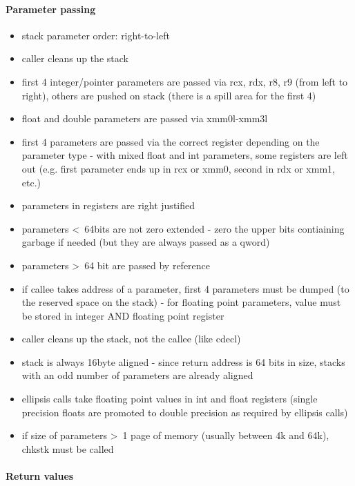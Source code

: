 \paragraph{Parameter passing}

\begin{itemize}
\item stack parameter order: right-to-left
\item caller cleans up the stack
\item first 4 integer/pointer parameters are passed via rcx, rdx, r8, r9 (from left to right), others are pushed on stack (there is a
spill area for the first 4)
\item float and double parameters are passed via xmm0l-xmm3l
\item first 4 parameters are passed via the correct register depending on the parameter type - with mixed float and int parameters,
some registers are left out (e.g. first parameter ends up in rcx or xmm0, second in rdx or xmm1, etc.)
\item parameters in registers are right justified
\item parameters \textless\ 64bits are not zero extended - zero the upper bits contiaining garbage if needed (but they are always
passed as a qword)
\item parameters \textgreater\ 64 bit are passed by reference
\item if callee takes address of a parameter, first 4 parameters must be dumped (to the reserved space on the stack) - for
floating point parameters, value must be stored in integer AND floating point register
\item caller cleans up the stack, not the callee (like cdecl)
\item stack is always 16byte aligned - since return address is 64 bits in size, stacks with an odd number of parameters are
already aligned
\item ellipsis calls take floating point values in int and float registers (single precision floats are promoted to double precision as
required by ellipsis calls)
\item if size of parameters \textgreater\ 1 page of memory (usually between 4k and 64k), chkstk must be called
\end{itemize}


\paragraph{Return values}

